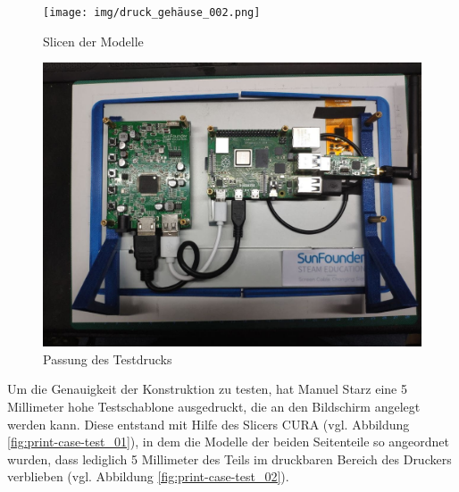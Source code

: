 	\begin{figure}[h!]
		\texttt{[image: img/druck\_gehäuse\_002.png]}
		\caption[Slicen der Modelle]{Slicen der Modelle}
		\label{fig:print-case-test_03}
	\end{figure}
	\begin{figure}[h!]
		\includegraphics[width=1\textwidth]{img/testdruck_an_bildschirm.jpg}
		\caption[Passung des Testdrucks]{Passung des Testdrucks}
		\label{fig:print-case-test_04}
	\end{figure}
\noindent Um die Genauigkeit der Konstruktion zu testen, hat Manuel Starz eine 5 Millimeter hohe Testschablone ausgedruckt, die an den Bildschirm angelegt werden kann. 
Diese entstand mit Hilfe des Slicers CURA (vgl. Abbildung \ref{fig:print-case-test_01}), in dem die Modelle der beiden Seitenteile so angeordnet wurden, dass lediglich 5 Millimeter des Teils im druckbaren Bereich des Druckers verblieben (vgl. Abbildung \ref{fig:print-case-test_02}).\par